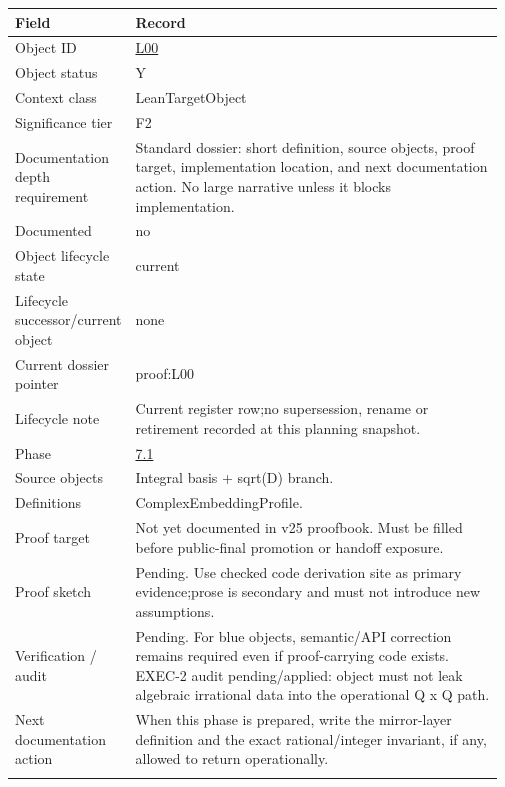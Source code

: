\begin{longtable}{L{0.16\linewidth} L{0.81\linewidth}}
\hline
\textbf{Field} & \textbf{Record}\\
\hline
Object ID & \hyperlink{object-row-L00}{L00}\\
\hline\addlinespace[0.20em]
Object status & Y\\
\hline\addlinespace[0.20em]
Context class & LeanTargetObject\\
\hline\addlinespace[0.20em]
Significance tier & F2\\
\hline\addlinespace[0.20em]
Documentation depth requirement & Standard dossier: short definition, source objects, proof target, implementation location, and next documentation action. No large narrative unless it blocks implementation.\\
\hline\addlinespace[0.20em]
Documented & no\\
\hline\addlinespace[0.20em]
Object lifecycle state & current\\
\hline\addlinespace[0.20em]
Lifecycle successor/\allowbreak{}current object & none\\
\hline\addlinespace[0.20em]
Current dossier pointer & proof:L00\\
\hline\addlinespace[0.20em]
Lifecycle note & Current register row;\newline no supersession, rename or retirement recorded at this planning snapshot.\\
\hline\addlinespace[0.20em]
Phase & \hyperlink{phase-row-7-1}{7.1}\\
\hline\addlinespace[0.20em]
Source objects & Integral basis + sqrt(D) branch.\\
\hline\addlinespace[0.20em]
Definitions & ComplexEmbeddingProfile.\\
\hline\addlinespace[0.20em]
Proof target & Not yet documented in v25 proofbook. Must be filled before public-final promotion or handoff exposure.\\
\hline\addlinespace[0.20em]
Proof sketch & Pending. Use checked code derivation site as primary evidence;\newline prose is secondary and must not introduce new assumptions.\\
\hline\addlinespace[0.20em]
Verification /\allowbreak{} audit & Pending. For blue objects, semantic/\allowbreak{}API correction remains required even if proof-carrying code exists. EXEC-2 audit pending/\allowbreak{}applied: object must not leak algebraic irrational data into the operational Q x Q path.\\
\hline\addlinespace[0.20em]
Next documentation action & When this phase is prepared, write the mirror-layer definition and the exact rational/\allowbreak{}integer invariant, if any, allowed to return operationally.\\
\hline\addlinespace[0.20em]
\end{longtable}

